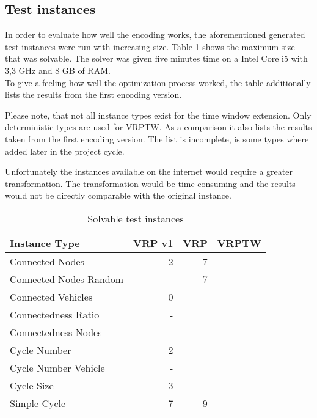 \documentclass[12pt, letterpaper]{article}
\begin{document}
\subsection{Test instances}
In order to evaluate how well the encoding works, the aforementioned generated test instances were run with increasing size. Table \ref{table:benchmark} shows the maximum size that was solvable. The solver was given five minutes time on a Intel Core i5 with 3,3 GHz and 8 GB of RAM.\\
To give a feeling how well the optimization process worked, the table additionally lists the results from the first encoding version.

Please note, that not all instance types exist for the time window extension. Only deterministic types are used for VRPTW.
As a comparison it also lists the results taken from the first encoding version. The list is incomplete, is some types where added later in the project cycle.

Unfortunately the instances available on the internet would require a greater transformation. The transformation would be time-consuming and the results would not be directly comparable with the original instance.

\begin{table}
\begin{tabular}{l | r | r | r}
Instance Type			& VRP v1	& VRP	& VRPTW\\
\hline
Connected Nodes			& 2			& 7		& \\
Connected Nodes Random	& -			& 7		& \\
Connected Vehicles		& 0			& 		& \\
Connectedness Ratio		& -			& 		& \\
Connectedness Nodes		& -			& 		& \\
Cycle Number			& 2			& 		& \\
Cycle Number Vehicle	& -			& 		& \\
Cycle Size				& 3 		& 		& \\
Simple Cycle			& 7			& 9		& \\
\end{tabular}
\caption{Solvable test instances}
\label{table:benchmark}
\end{table}
\end{document}
